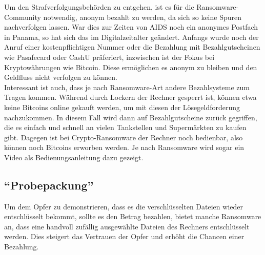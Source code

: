 Um den Strafverfolgungsbehörden zu entgehen, ist es für die Ransomware-Community notwendig, anonym bezahlt zu werden, da sich so keine Spuren nachverfolgen lassen. War dies zur Zeiten von AIDS noch ein anonymes Postfach in Panama, so hat sich das im Digitalzeitalter geändert. Anfangs wurde noch der Anruf einer kostenpflichtigen Nummer oder die Bezahlung mit Bezahlgutscheinen wie Pasafecard oder CashU präferiert, inzwischen ist der Fokus bei Kryptowährungen wie Bitcoin. Diese ermöglichen es anonym zu bleiben und den Geldfluss nicht verfolgen zu können.\\

Interessant ist auch, dass je nach Ransomware-Art andere Bezahlsysteme zum Tragen kommen. Während durch Lockern der Rechner gesperrt ist, können etwa keine Bitcoins online gekauft werden, um mit diesen der Lösegeldforderung nachzukommen. In diesem Fall wird dann auf Bezahlgutscheine zurück gegriffen, die es einfach und schnell an vielen Tankstellen und Supermärkten zu kaufen gibt. Dagegen ist bei Crypto-Ransomware der Rechner noch bedienbar, also können noch Bitcoins erworben werden. Je nach Ransomware wird sogar ein Video als Bedienungsanleitung dazu gezeigt.

\subsection{"`Probepackung"'}

Um dem Opfer zu demonstrieren, dass es die verschlüsselten Dateien wieder entschlüsselt bekommt, sollte es den Betrag bezahlen, bietet manche Ransomware an, dass eine handvoll zufällig ausgewählte Dateien des Rechners entschlüsselt werden. Dies steigert das Vertrauen der Opfer und erhöht die Chancen einer Bezahlung.